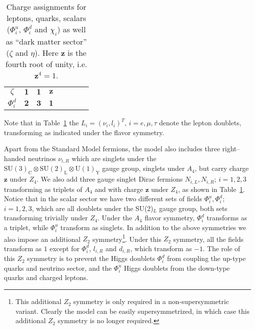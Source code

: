 \documentclass[english,10pt,aps,prd,a4paper,preprintnumbers,floatfix,nofootinbib,showpacs,superscriptaddress]{revtex4-1}
\def\SM{$\mathrm{SU(3)_c \otimes SU(2)_L \otimes U(1)_Y}$ }
\newcommand{\sm}{{Standard Model }}
\def\SM{$\mathrm{ SU(3)_C \otimes SU(2)_L \otimes U(1)_Y }$ }
\begin{document}
\begin{table}[ht]
\begin{center}
\begin{tabular}{c c c c || c c c c}
$\zeta$         \hspace{1cm}        & $\mathbf{1}$	\hspace{1cm}        & $\mathbf{1}$      \hspace{1cm}        &  $\mathbf{z}$       	 \\
$\Phi_i^d$      \hspace{1cm}        & $\mathbf{2}$	\hspace{1cm}        & $\mathbf{3}$      \hspace{1cm}        &  $\mathbf{1}$        \hspace{1cm}     &		           
                \hspace{1cm}        & 		 	\hspace{1cm}        & 			\hspace{1cm}        &     	          \\
    \hline
  \end{tabular}
\end{center}
\caption{Charge assignments for leptons, quarks,  scalars 
  ($\Phi_i^u$, $\Phi_i^d$ and $\chi_i$) as well as ``dark matter sector'' 
  ($\zeta$ and $\eta$). Here $\mathbf{z}$ is the fourth root
  of unity, i.e. $\mathbf{z}^4 = 1$.  }
 \label{tab1} 
\end{table}
%
Note that in Table~\ref{tab1} the $L_i = (\nu_i, l_i)^T$,
$i = e, \mu, \tau$ denote the lepton doublets, transforming as
indicated under the flavor symmetry.

Apart from the \sm fermions, the model also includes three
right--handed neutrinos $\nu_{i,R}$ which are singlets under the \SM
gauge group, singlets under $A_4$, but carry charge $\mathbf{z}$ under
$Z_4$. We also add three gauge singlet Dirac fermions
$N_{i,L}, N_{i,R}$; $i = 1, 2, 3$ transforming as triplets of $A_4$
and with charge $\mathbf{z}$ under $Z_4$, as shown in
Table~\ref{tab1}.
Notice that in the scalar sector we have two different sets of fields
$\Phi^u_i, \Phi^d_i$; $i = 1,2,3$, which are all doublets under the
SU(2)$_L$ gauge group, both sets transforming trivially under
$Z_4$. Under the $A_4$ flavor symmetry, $\Phi_i^d$ transforms as a
triplet, while $\Phi_i^u$ transform as singlets. In addition to the
above symmetries we also impose an additional $Z_2$
symmetry\footnote{This additional $Z_2$ symmetry is only required in a
  non-supersymmetric variant. Clearly the model can be easily
  supersymmetrized, in which case this additional $Z_2$ symmetry is no
  longer required.}.  Under this $Z_2$ symmetry, all the fields
transform as $1$ except for $\Phi^d_i$, $l_{i,R}$ and $d_{i, R}$,
which transform as $-1$. The role of this $Z_2$ symmetry is to prevent
the Higgs doublets $\Phi_i^d$ from coupling the up-type quarks and
neutrino sector, and the $\Phi^u_i$ Higgs doublets from the down-type
quarks and charged leptons.
\end{document}
